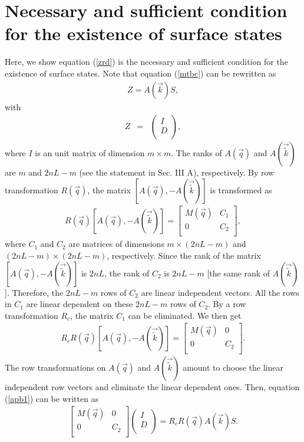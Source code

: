 \documentclass[aps,pra,amsmath,twocolumn,showpacs,bibnotes,10pt]{revtex4-1}
\begin{document}
\section{Necessary and sufficient condition for the existence of surface states}
\renewcommand{\theequation}{B\arabic{equation}}
\setcounter{equation}{0}

Here, we show equation (\ref{zrd}) is the necessary and sufficient condition for the existence of surface states. Note that equation (\ref{mtbc}) can be rewritten as 
\begin{eqnarray}
[A(\vec q),-A(\vec{\tilde k})] Z = A(\vec k) S, \label{apb1}
\end{eqnarray}
with
\begin{eqnarray}
Z &=&\begin{pmatrix}
	I \\
	D \\
\end{pmatrix},                         \nonumber  
\end{eqnarray}
where $I$ is an unit matrix of dimension $m\times m$. The ranks of $A(\vec q)$ and $A(\vec{\tilde k})$ are $m$ and $2nL-m$ (see the statement in Sec. III A), respectively. By row transformation $R(\vec q)$, the matrix $[A(\vec q),-A(\vec{\tilde k})]$ is transformed as 
\begin{eqnarray}
R(\vec q)[A(\vec q),-A(\vec{\tilde k})]=\begin{bmatrix}
	M(\vec q)& C_1\\
	0&C_2\\
\end{bmatrix},  
\nonumber
\end{eqnarray}
where $C_1$ and $C_2$ are matrices of dimensions $m\times (2nL-m)$ and $(2nL-m)\times (2nL-m)$, respectively. Since the rank of the matrix $[A(\vec q),-A(\vec{\tilde k})]$ is $2nL$, the rank of $C_2$ is $2nL-m$ [the same rank of $A(\vec{\tilde k})$]. Therefore, the $2nL-m$ rows of $C_2$ are linear independent vectors. All the rows in $C_1$ are linear dependent on these $2nL-m$ rows of $C_2$. By a row transformation $R_c$, the matrix $C_1$ can be eliminated. We then get
\begin{eqnarray}
R_cR(\vec q)[A(\vec q),-A(\vec{\tilde k})]=\begin{bmatrix}
	M(\vec q)& 0\\
	0&C_2\\
\end{bmatrix}.  
\label{apb2}
\end{eqnarray}
The row transformations on $A(\vec q)$ and $A(\vec{\tilde k})$ amount to choose the linear independent row vectors and eliminate the linear dependent ones. Then, equation (\ref{apb1}) can be written as
\begin{eqnarray}
\begin{bmatrix}
	M(\vec q)& 0\\
	0&C_2\\
\end{bmatrix}\begin{pmatrix}
	I \\
	D \\
\end{pmatrix} =  R_cR(\vec q)A(\vec k)S. 
\label{apb3}
\end{eqnarray}
\end{document}
